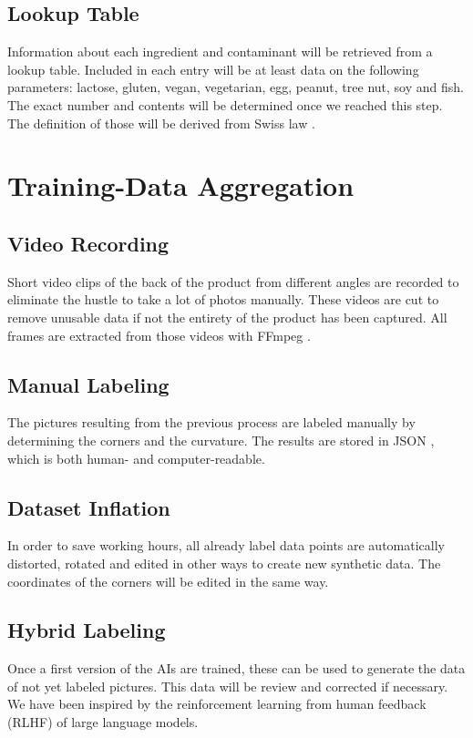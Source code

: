 \documentclass[a4paper,11pt]{report}
\begin{document}
            \subsection{Lookup Table}
                \label{subsec:architecture:table}
                Information about each ingredient and contaminant will be retrieved from a lookup table. Included in each entry will be at least data on the following parameters: lactose, gluten, vegan, vegetarian, egg, peanut, tree nut, soy and fish. The exact number and contents will be determined once we reached this step. The definition of those will be derived from Swiss law \cite{fedlex-ingredient}.

        \section{Training-Data Aggregation}

            \subsection{Video Recording}
                \label{subsec:data:recording}
                Short video clips of the back of the product from different angles are recorded to eliminate the hustle to take a lot of photos manually. These videos are cut to remove unusable data if not the entirety of the product has been captured. All frames are extracted from those videos with FFmpeg \cite{ffmpeg} \cite{ffmpeg-python}.

            \subsection{Manual Labeling}
                The pictures resulting from the previous process are labeled manually by determining the corners and the curvature. The results are stored in JSON \cite{json}, which is both human- and computer-readable.

            \subsection{Dataset Inflation}
                \label{subsec:data:inflation}
                In order to save working hours, all already label data points are automatically distorted, rotated and edited in other ways to create new synthetic data. The coordinates of the corners will be edited in the same way.

            \subsection{Hybrid Labeling}
                Once a first version of the AIs are trained, these can be used to generate the data of not yet labeled pictures. This data will be review and corrected if necessary. We have been inspired by the reinforcement learning from human feedback (RLHF) \cite{rlhf1} \cite{rlhf2}  of large language models.
\end{document}
